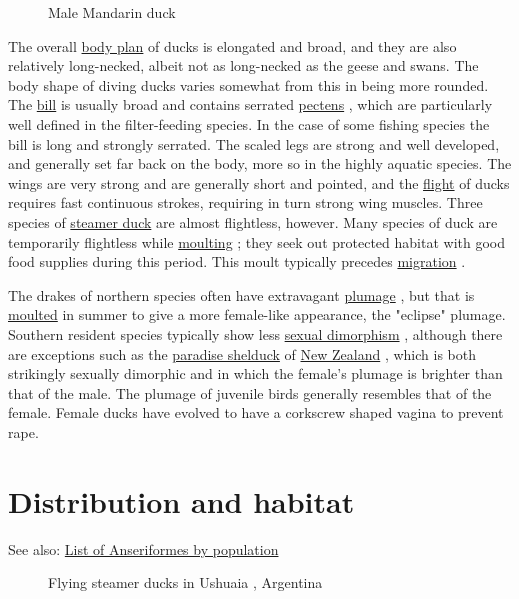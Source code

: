 \documentclass[11pt,a4paper]{article}
\begin{document}
\begin{figure}[h]
\caption{Male Mandarin duck}
\end{figure}

The overall \href{/wiki/Body\_plan}{body plan} of ducks is elongated and broad, and they are also relatively long-necked, albeit not as long-necked as the geese and swans. The body shape of diving ducks varies somewhat from this in being more rounded. The \href{/wiki/Beak}{bill} is usually broad and contains serrated \href{/wiki/Pecten\_(biology)}{pectens} , which are particularly well defined in the filter-feeding species. In the case of some fishing species the bill is long and strongly serrated. The scaled legs are strong and well developed, and generally set far back on the body, more so in the highly aquatic species. The wings are very strong and are generally short and pointed, and the \href{/wiki/Bird\_flight}{flight} of ducks requires fast continuous strokes, requiring in turn strong wing muscles. Three species of \href{/wiki/Steamer\_duck}{steamer duck} are almost flightless, however. Many species of duck are temporarily flightless while \href{/wiki/Moult}{moulting} ; they seek out protected habitat with good food supplies during this period. This moult typically precedes \href{/wiki/Bird\_migration}{migration} .

The drakes of northern species often have extravagant \href{/wiki/Plumage}{plumage} , but that is \href{/wiki/Moult}{moulted} in summer to give a more female-like appearance, the "eclipse" plumage. Southern resident species typically show less \href{/wiki/Sexual\_dimorphism}{sexual dimorphism} , although there are exceptions such as the \href{/wiki/Paradise\_shelduck}{paradise shelduck} of \href{/wiki/New\_Zealand}{New Zealand} , which is both strikingly sexually dimorphic and in which the female's plumage is brighter than that of the male. The plumage of juvenile birds generally resembles that of the female. Female ducks have evolved to have a corkscrew shaped vagina to prevent rape.

\section{Distribution and habitat}

See also: \href{/wiki/List\_of\_Anseriformes\_by\_population}{List of Anseriformes by population}

\begin{figure}[h]
\caption{Flying steamer ducks in Ushuaia , Argentina}
\end{figure}
\end{document}
